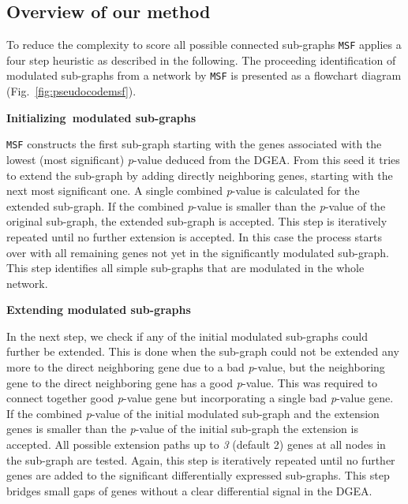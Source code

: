 \documentclass[10pt,a4paper,twocolumn]{article}
\begin{document}
\subsection*{Overview of our method}

To reduce the complexity to score all possible connected sub-graphs
\texttt{MSF} applies a four step heuristic as described in the
following. The proceeding identification of modulated sub-graphs from a
network by \texttt{MSF} is presented as a flowchart diagram
(Fig.~\ref{fig:pseudocodemsf}). \newline



\textbf{Initializing modulated sub-graphs}

\texttt{MSF} constructs the first sub-graph starting with the genes
associated with the lowest (most significant) \textit{p}-value deduced from
the DGEA. From this seed it tries to extend the sub-graph by adding directly
neighboring genes, starting with the next most significant one. A single
combined \textit{p}-value is calculated for the extended sub-graph.
If the combined \textit{p}-value is smaller than the \textit{p}-value of
the original sub-graph,
the extended sub-graph is accepted. This step is
iteratively repeated until no further extension is accepted. In this case
the process starts over with all remaining genes not yet in the significantly
modulated sub-graph. This step identifies all simple sub-graphs that
are modulated in the whole network.\newline

\textbf{Extending modulated sub-graphs}

In the next step, we check if any of the initial modulated sub-graphs 
could further be extended. This is done when the sub-graph could not be extended any more to the direct neighboring gene due to a bad \textit{p}-value, but the neighboring gene to the direct neighboring gene has a good \textit{p}-value. This was required to connect together good \textit{p}-value gene but incorporating a single bad \textit{p}-value gene. If the combined \textit{p}-value of the initial modulated sub-graph and the extension genes is smaller than the \textit{p}-value of the initial sub-graph the extension is accepted. All possible extension paths up to \emph{3} (default 2) genes at
all nodes in the sub-graph are tested. Again, this step is iteratively repeated until
no further genes are added to the significant differentially expressed
sub-graphs. This step bridges small gaps of genes without a clear
differential signal in the DGEA.\newline
\end{document}
